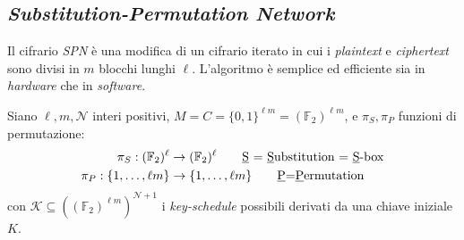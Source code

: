 




\subsection{\textit{Substitution-Permutation Network}}
Il cifrario \emph{SPN} è una modifica di un cifrario iterato in cui i \emph{plaintext} e \emph{ciphertext} sono divisi in $m$ blocchi lunghi $\ell$. L'algoritmo è semplice ed efficiente sia in \textit{hardware} che in \textit{software}.

\vspace{1em} \noindent   Siano $\ell,m, \mathcal{N}$ interi positivi, $M = C = \{0,1\}^{\ell m}=(\mathbb{F}_2)^{\ell m}$, e $\pi_S, \pi_P$ funzioni di permutazione:
    \begin{align*}
        \pi_S: (\mathbb{F}_2)^{\ell} &\to (\mathbb{F}_2)^{\ell} \qquad \text{\underline{S} = \underline{S}ubstitution = \underline{S}-box}\\
        \pi_P: \{1,\dots,\ell m\} &\to \{1,\dots, \ell m\} \qquad \text{\underline{P}=\underline{P}ermutation}
    \end{align*}
    con $\mathcal{K} \subseteq ((\mathbb{F}_2)^{\ell m})^{\mathcal{N}+1}$ i \emph{key-schedule} possibili derivati da una chiave iniziale $K$.

